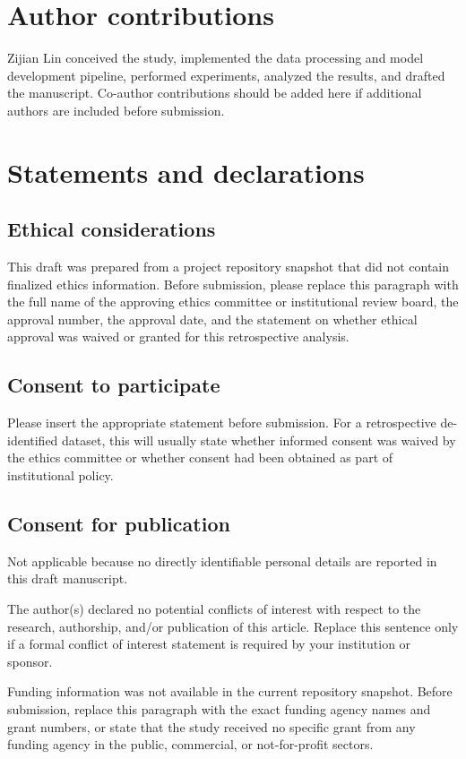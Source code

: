 \documentclass[Afour,sagev,times]{sagej}
\begin{document}
\section*{Author contributions}
Zijian Lin conceived the study, implemented the data processing and model development pipeline, performed experiments, analyzed the results, and drafted the manuscript. Co-author contributions should be added here if additional authors are included before submission.

\section*{Statements and declarations}
\subsection*{Ethical considerations}
This draft was prepared from a project repository snapshot that did not contain finalized ethics information. Before submission, please replace this paragraph with the full name of the approving ethics committee or institutional review board, the approval number, the approval date, and the statement on whether ethical approval was waived or granted for this retrospective analysis.

\subsection*{Consent to participate}
Please insert the appropriate statement before submission. For a retrospective de-identified dataset, this will usually state whether informed consent was waived by the ethics committee or whether consent had been obtained as part of institutional policy.

\subsection*{Consent for publication}
Not applicable because no directly identifiable personal details are reported in this draft manuscript.

\begin{dci}
The author(s) declared no potential conflicts of interest with respect to the research, authorship, and/or publication of this article. Replace this sentence only if a formal conflict of interest statement is required by your institution or sponsor.
\end{dci}

\begin{funding}
Funding information was not available in the current repository snapshot. Before submission, replace this paragraph with the exact funding agency names and grant numbers, or state that the study received no specific grant from any funding agency in the public, commercial, or not-for-profit sectors.
\end{funding}
\end{document}
